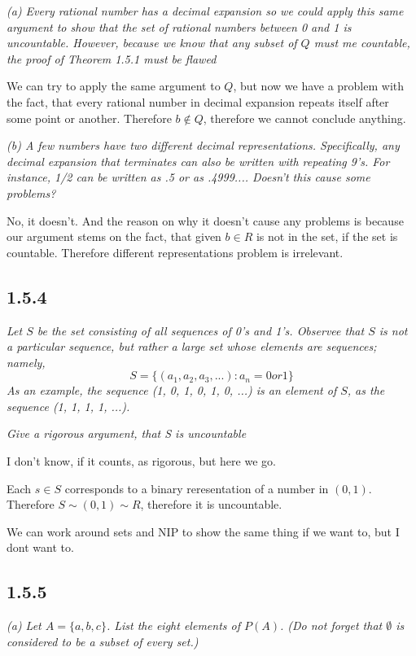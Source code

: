 \documentclass[11pt,oneside,titlepage]{book}
\begin{document}
\textit{(a) Every rational number has a decimal expansion so we could apply
  this same argument to show that the set of rational numbers between 0 and 1
  is uncountable. However, because we know that any subset of $Q$ must me countable,
  the proof of Theorem 1.5.1 must be flawed}

We can try to apply the same argument to $Q$, but now we have a problem with the
fact, that every rational number in decimal expansion repeats itself after some
point or another. Therefore $b \notin Q$, therefore we cannot conclude anything.

\textit{(b) A few numbers have two different decimal representations. Specifically,
  any decimal expansion that terminates can also be written with repeating 9's.
  For instance, 1/2 can be written as .5 or as .4999.... Doesn't this cause some
  problems?}

No, it doesn't. And the reason on why it doesn't cause any problems is because
our argument stems on the fact, that given $b \in R$ is not in the set,
if the set is countable. Therefore different representations problem is irrelevant.

\subsection*{1.5.4}
\textit{Let $S$ be the set consisting of all sequences of 0's and 1's. Observee that $S$
  is not a particular sequence, but rather a large set whose elements are sequences;
  namely,}
$$S = \{(a_1, a_2, a_3,...): a_n = 0 or 1\}$$
\textit{As an example, the sequence (1, 0, 1, 0, 1, 0, ...) is an element of $S$, as the
  sequence (1, 1, 1, 1, ...).}

\textit{Give a rigorous argument, that S is uncountable}

I don't know, if it counts, as rigorous, but here we go.

Each $s \in S$ corresponds to a binary reresentation of a number in $(0, 1)$. Therefore
$S \sim (0, 1) \sim R$, therefore it is uncountable.

We can work around sets and NIP to show the same thing if we want to, but I dont want to.

\subsection*{1.5.5}
\textit{(a) Let $A = \{a, b, c\}$. List the eight elements of $P(A)$. (Do not forget that
  $\emptyset$ is considered to be a subset of every set.)}
\end{document}
